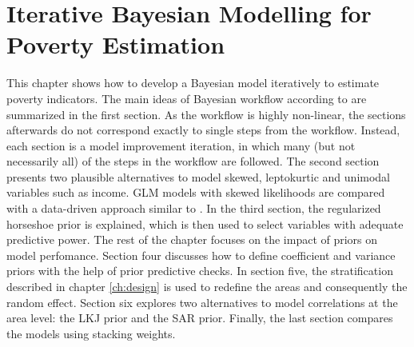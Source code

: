 \chapter{Iterative Bayesian Modelling for Poverty Estimation}

\label{ch:workflow}

This chapter shows how to develop a Bayesian model iteratively to estimate poverty indicators.
The main ideas of Bayesian workflow according to \cite{gelman_bayesian_2020} are summarized in the first section. As the workflow is highly non-linear, the sections afterwards do not correspond exactly to single steps from the workflow.
Instead, each section is a model improvement iteration, in which many (but not necessarily all) of the steps in the workflow are followed.
The second section presents two plausible alternatives to model skewed, leptokurtic and unimodal variables such as income. GLM models with skewed likelihoods are compared with a data-driven approach similar to \cite{morelli_hierarchical_2021}.
In the third section, the regularized horseshoe prior is explained, which is then used to select variables with adequate predictive power.
The rest of the chapter focuses on the impact of priors on model perfomance.
Section four discusses how to define coefficient and variance priors with the help of prior predictive checks.
In section five, the stratification described in chapter \ref{ch:design} is used to redefine the areas and consequently the random effect.
Section six explores two alternatives to model correlations at the area level: the LKJ prior and the SAR prior.
Finally, the last section compares the models using stacking weights.









